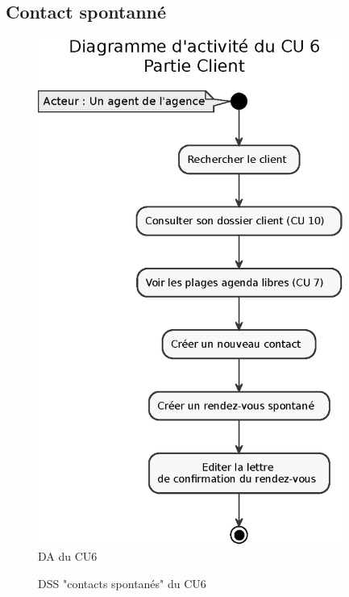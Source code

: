 \subsection{Contact spontanné}
\begin{figure}[H]
\centering
\includegraphics[width=10cm]{figures/eps/DA_CU6_partieClient.eps}
\caption{DA du CU6}
\end{figure}

\begin{figure}[H]
\noindent{}
\caption{DSS "contacts spontanés" du CU6}
\end{figure}



